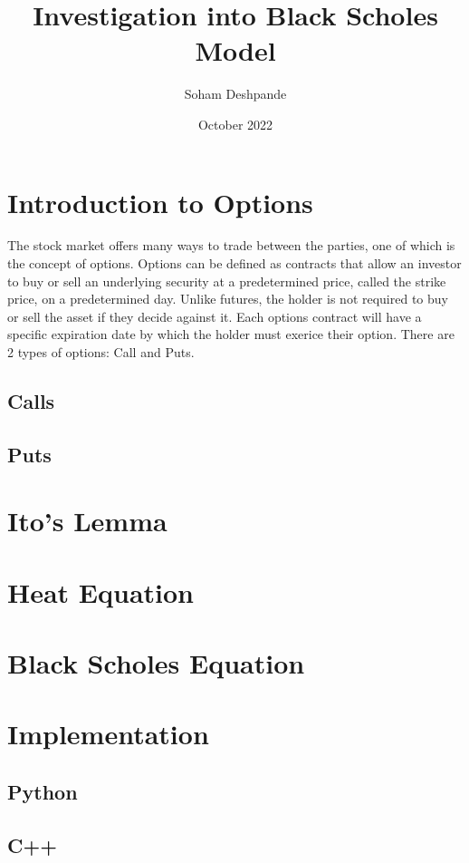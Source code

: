 \documentclass{article}
\title{Investigation into Black Scholes Model}
\author{Soham Deshpande}
\date{October 2022}
\begin{document}
\maketitle
\clearpage
\tableofcontents
\clearpage

\section{Introduction to Options}
The stock market offers many ways to trade between the parties, one of which
is the concept of options. Options can be defined as contracts that allow an
investor to buy or sell an underlying security at a predetermined price, called
the strike price, on a predetermined day. Unlike futures, the holder is not
required to buy or sell the asset if they decide against it.
Each options contract will have a specific expiration date by which the holder
must exerice their option. There are 2 types of options: Call and Puts. \\

\subsection{Calls}

\subsection{Puts}

\clearpage
\section{Ito's Lemma}


\clearpage
\section{Heat Equation}


\clearpage
\section{Black Scholes Equation}


\clearpage
\section{Implementation}


\clearpage
\subsection{Python}


\clearpage
\subsection{C++}
\end{document}
